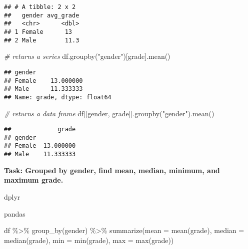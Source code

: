 \documentclass[
]{book}
\newenvironment{Shaded}{\begin{snugshade}}{\end{snugshade}}
\newcommand{\AttributeTok}[1]{\textcolor[rgb]{0.77,0.63,0.00}{#1}}
\newcommand{\CommentTok}[1]{\textcolor[rgb]{0.56,0.35,0.01}{\textit{#1}}}
\newcommand{\FunctionTok}[1]{\textcolor[rgb]{0.00,0.00,0.00}{#1}}
\newcommand{\NormalTok}[1]{#1}
\newcommand{\SpecialCharTok}[1]{\textcolor[rgb]{0.00,0.00,0.00}{#1}}
\newcommand{\StringTok}[1]{\textcolor[rgb]{0.31,0.60,0.02}{#1}}
\begin{document}
\begin{verbatim}
## # A tibble: 2 x 2
##   gender avg_grade
##   <chr>      <dbl>
## 1 Female      13  
## 2 Male        11.3
\end{verbatim}

\begin{Shaded}
\begin{Highlighting}[]
\CommentTok{\# returns a series}
\NormalTok{df.groupby(}\StringTok{"gender"}\NormalTok{)[}\StringTok{\textquotesingle{}grade\textquotesingle{}}\NormalTok{].mean()}
\end{Highlighting}
\end{Shaded}

\begin{verbatim}
## gender
## Female    13.000000
## Male      11.333333
## Name: grade, dtype: float64
\end{verbatim}

\begin{Shaded}
\begin{Highlighting}[]
\CommentTok{\# returns a data frame}
\NormalTok{df[[}\StringTok{\textquotesingle{}gender\textquotesingle{}}\NormalTok{, }\StringTok{\textquotesingle{}grade\textquotesingle{}}\NormalTok{]].groupby(}\StringTok{"gender"}\NormalTok{).mean()}
\end{Highlighting}
\end{Shaded}

\begin{verbatim}
##             grade
## gender           
## Female  13.000000
## Male    11.333333
\end{verbatim}

{\textbf{Task: Grouped by gender, find mean, median, minimum, and maximum grade.
}}

dplyr

pandas

\begin{Shaded}
\begin{Highlighting}[]
\NormalTok{df }\SpecialCharTok{\%\textgreater{}\%} 
  \FunctionTok{group\_by}\NormalTok{(gender) }\SpecialCharTok{\%\textgreater{}\%} 
  \FunctionTok{summarize}\NormalTok{(}\AttributeTok{mean =} \FunctionTok{mean}\NormalTok{(grade),}
            \AttributeTok{median =} \FunctionTok{median}\NormalTok{(grade),}
            \AttributeTok{min =} \FunctionTok{min}\NormalTok{(grade),}
            \AttributeTok{max =} \FunctionTok{max}\NormalTok{(grade))}
\end{Highlighting}
\end{Shaded}
\end{document}
